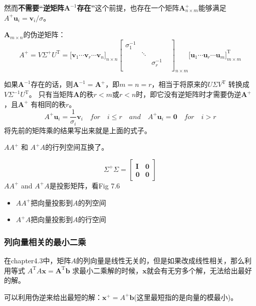 然而\textbf{不需要“逆矩阵$\bm{A}^{-1}$存在”}这个前提，也存在一个矩阵$\bm{A}^{+}_{n\times m}$能够满足$A^{+} \boldsymbol{u}_i=\boldsymbol{v}_i / \sigma$。

$\bm{A}_{m\times n}$的伪逆矩阵：
$$A^{+}=V \Sigma^{+} U^{\mathrm{T}} =
\Biggl[\boldsymbol{v}_{1} \cdots \boldsymbol{v}_{r} \cdots \boldsymbol{v}_{n}\Biggr]_{n\times n}
\left[\begin{array}{cccc}
\sigma_{1}^{-1} & & & \\
& \ddots & \\
& & \sigma_{r}^{-1} & \\
& & & 
\end{array}\right]_{n \times m}
\Biggl[\boldsymbol{u}_{1} \cdots \boldsymbol{u}_{r} \cdots \boldsymbol{u}_{m}\Biggr]^{\mathrm{T}}_{m\times m}
$$

如果$\bm{A}^{-1}$存在的话，则$\bm{A}^{-1}=\bm{A}^{+}$，即$m=n=r$，相当于将原来的$U \Sigma V^{\mathrm{T}}$ 转换成 $V \Sigma^{-1} U^{\mathrm{T}}$。
只有当矩阵$\bm{A}$的秩$r<m$或$r<n$时，即它没有逆矩阵时才需要伪逆$\bm{A}^{+}$，且$\bm{A}^{+}$
有相同的秩$r$。
$$A^{+} \boldsymbol{u}_{i}=\frac{1}{\sigma_{i}} \boldsymbol{v}_{i} \quad  for \quad i \leq r \quad and \quad A^{+} \boldsymbol{u}_{i}=\mathbf{0} \quad for \quad i>r$$
将先前的矩阵乘的结果写出来就是上面的式子。

$A A^{+}$ 和 $A^{+} A$的行列空间互换了。

$$\Sigma^{+} \Sigma=
\left[\begin{array}{ll} \bm{I} & \bm{0} \\ \bm{0} & \bm{0}\end{array}\right]
$$
$A A^{+}$ and $A^{+} A$是投影矩阵，看Fig 7.6
\begin{itemize}
    \item $A A^{+}$把向量投影到$A$的列空间
    \item $A^{+} A$把向量投影到$A$的行空间
\end{itemize}

\subsubsection{列向量相关的最小二乘}
在chapter4.3中，矩阵$A$的列向量是线性无关的，但是如果改成线性相关，那么利用等式
$A^{\mathrm{T}} A \boldsymbol{x}=\boldsymbol{A}^{\mathrm{T}} \boldsymbol{b}$
求最小二乘解的时候，$\bm{x}$就会有无穷多个解，无法给出最好的解。

可以利用伪逆来给出最短的解：$\bm{x}^{+}=A^{+} \bm{b}$(这里最短指的是向量的模最小)。